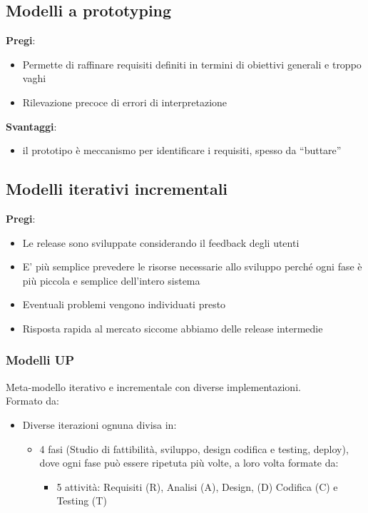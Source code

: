 \subsection{Modelli a prototyping}
\textbf{Pregi}:
\begin{itemize}
    \item Permette di raffinare requisiti definiti in termini di obiettivi generali e troppo vaghi
    \item Rilevazione precoce di errori di interpretazione
\end{itemize}

\noindent \textbf{Svantaggi}:
\begin{itemize}
    \item il prototipo è meccanismo per identificare i requisiti, spesso da “buttare”
\end{itemize}

\subsection{Modelli iterativi incrementali}
\textbf{Pregi}:
\begin{itemize}
    \item Le release sono sviluppate considerando il feedback degli utenti
    \item E’ più semplice prevedere le risorse necessarie allo sviluppo perché ogni fase è più piccola e semplice dell'intero sistema
    \item Eventuali problemi vengono individuati presto
    \item Risposta rapida al mercato siccome abbiamo delle release intermedie
\end{itemize}

\subsubsection{Modelli UP}
Meta-modello iterativo e incrementale con diverse implementazioni.\\
Formato da:
\begin{itemize}
    \item Diverse iterazioni ognuna divisa in:
    \begin{itemize}
        \item 4 fasi (Studio di fattibilità, sviluppo, design codifica e testing, deploy), dove ogni fase può essere ripetuta più volte, a loro volta formate da:
        \begin{itemize}
            \item 5 attività: Requisiti (R), Analisi (A), Design, (D) Codifica (C) e Testing (T)
        \end{itemize}
    \end{itemize}
\end{itemize}

